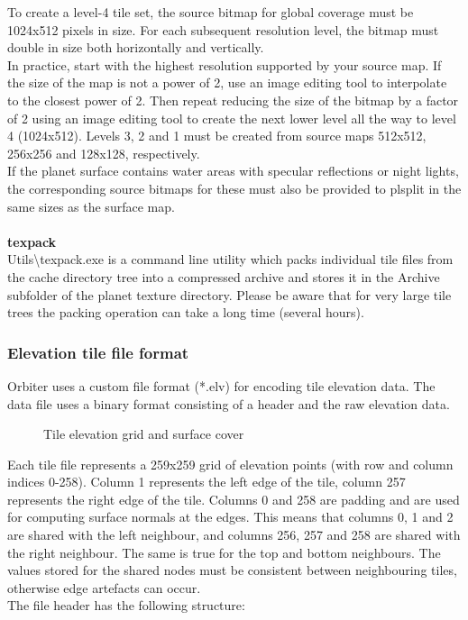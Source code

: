 \documentclass[Orbiter Developer Manual.tex]{subfiles}
\begin{document}
To create a level-4 tile set, the source bitmap for global coverage must be 1024x512 pixels in size. For each subsequent resolution level, the bitmap must double in size both horizontally and vertically.\\
In practice, start with the highest resolution supported by your source map. If the size of the map is not a power of 2, use an image editing tool to interpolate to the closest power of 2. Then repeat reducing the size of the bitmap by a factor of 2 using an image editing tool to create the next lower level all the way to level 4 (1024x512). Levels 3, 2 and 1 must be created from source maps 512x512, 256x256 and 128x128, respectively.\\
If the planet surface contains water areas with specular reflections or night lights, the corresponding source bitmaps for these must also be provided to plsplit in the same sizes as the surface map.\\
\\
\textbf{texpack}\\
\label{texpack}
Utils\textbackslash texpack.exe is a command line utility which packs individual tile files from the cache directory tree into a compressed archive and stores it in the Archive subfolder of the planet texture directory. Please be aware that for very large tile trees the packing operation can take a long time (several hours).


\subsubsection{Elevation tile file format}
\label{sssec:elev_tile_format}
Orbiter uses a custom file format (*.elv) for encoding tile elevation data. The data file uses a binary format consisting of a header and the raw elevation data.

\begin{figure}[H]
	\centering
	\caption{Tile elevation grid and surface cover}
\end{figure}

\noindent
Each tile file represents a 259x259 grid of elevation points (with row and column indices 0-258). Column 1 represents the left edge of the tile, column 257 represents the right edge of the tile. Columns 0 and 258 are padding and are used for computing surface normals at the edges. This means that columns 0, 1 and 2 are shared with the left neighbour, and columns 256, 257 and 258 are shared with the right neighbour. The same is true for the top and bottom neighbours. The values stored for the shared nodes must be consistent between neighbouring tiles, otherwise edge artefacts can occur.\\
The file header has the following structure:
\end{document}
